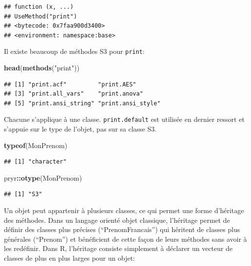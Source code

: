 \documentclass[
  12pt,
  french,
  a4paper,
  extrafontsizes,onecolumn,openright
  ]{memoir}
\newenvironment{Shaded}{\begin{snugshade}}{\end{snugshade}}
\newcommand{\KeywordTok}[1]{\textcolor[rgb]{0.13,0.29,0.53}{\textbf{#1}}}
\newcommand{\NormalTok}[1]{#1}
\newcommand{\OperatorTok}[1]{\textcolor[rgb]{0.81,0.36,0.00}{\textbf{#1}}}
\newcommand{\StringTok}[1]{\textcolor[rgb]{0.31,0.60,0.02}{#1}}
\begin{document}
\begin{verbatim}
## function (x, ...) 
## UseMethod("print")
## <bytecode: 0x7faa900d3400>
## <environment: namespace:base>
\end{verbatim}

\normalsize

Il existe beaucoup de méthodes S3 pour \texttt{print}:

\scriptsize

\begin{Shaded}
\begin{Highlighting}[]
\KeywordTok{head}\NormalTok{(}\KeywordTok{methods}\NormalTok{(}\StringTok{"print"}\NormalTok{))}
\end{Highlighting}
\end{Shaded}

\begin{verbatim}
## [1] "print.acf"         "print.AES"        
## [3] "print.all_vars"    "print.anova"      
## [5] "print.ansi_string" "print.ansi_style"
\end{verbatim}

\normalsize

Chacune s'applique à une classe. \texttt{print.default} est utilisée en dernier ressort et s'appuie sur le type de l'objet, pas sur sa classe S3.

\scriptsize

\begin{Shaded}
\begin{Highlighting}[]
\KeywordTok{typeof}\NormalTok{(MonPrenom)}
\end{Highlighting}
\end{Shaded}

\begin{verbatim}
## [1] "character"
\end{verbatim}

\begin{Shaded}
\begin{Highlighting}[]
\NormalTok{pryr}\OperatorTok{::}\KeywordTok{otype}\NormalTok{(MonPrenom)}
\end{Highlighting}
\end{Shaded}

\begin{verbatim}
## [1] "S3"
\end{verbatim}

\normalsize

Un objet peut appartenir à plusieurs classes, ce qui permet une forme d'héritage des méthodes.
Dans un langage orienté objet classique, l'héritage permet de définir des classes plus précises (\enquote{PrenomFrancais}) qui héritent de classes plus générales (\enquote{Prenom}) et bénéficient de cette façon de leurs méthodes sans avoir à les redéfinir.
Dans R, l'héritage consiste simplement à déclarer un vecteur de classes de plus en plus larges pour un objet:
\end{document}
